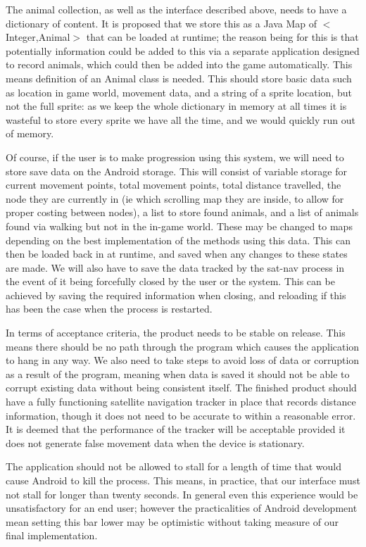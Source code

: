 \documentclass[]{report}
\begin{document}
The animal collection, as well as the interface described above, needs to have a dictionary of content. It is proposed that we store this as a Java Map of $<$Integer,Animal$>$ that can be loaded at runtime; the reason being for this is that potentially information could be added to this via a separate application designed to record animals, which could then be added into the game automatically. This means definition of an Animal class is needed. This should store basic data such as location in game world, movement data, and a string of a sprite location, but not the full sprite: as we keep the whole dictionary in memory at all times it is wasteful to store every sprite we have all the time, and we would quickly run out of memory. 

Of course, if the user is to make progression using this system, we will need to store save data on the Android storage. This will consist of variable storage for current movement points, total movement points, total distance travelled, the node they are currently in (ie which scrolling map they are inside, to allow for proper costing between nodes), a list to store found animals, and a list of animals found via walking but not in the in-game world. These may be changed to maps depending on the best implementation of the methods using this data. This can then be loaded back in at runtime, and saved when any changes to these states are made. We will also have to save the data tracked by the sat-nav process in the event of it being forcefully closed by the user or the system. This can be achieved by saving the required information when closing, and reloading if this has been the case when the process is restarted.

In terms of acceptance criteria, the product needs to be stable on release. This means there should be no path through the program which causes the application to hang in any way. We also need to take steps to avoid loss of data or corruption as a result of the program, meaning when data is saved it should not be able to corrupt existing data without being consistent itself. The finished product should have a fully functioning satellite navigation tracker in place that records distance information, though it does not need to be accurate to within a reasonable error. It is deemed that the performance of the tracker will be acceptable provided it does not generate false movement data when the device is stationary. 

The application should not be allowed to stall for a length of time that would cause Android to kill the process. This means, in practice, that our interface must not stall for longer than twenty seconds. In general even this experience would be unsatisfactory for an end user; however the practicalities of Android development mean setting this bar lower may be optimistic without taking measure of our final implementation.
\end{document}
